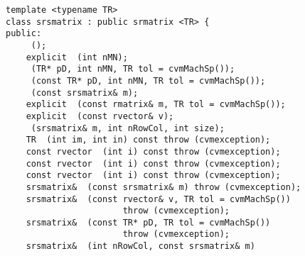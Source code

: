 \bigskip
\noindent
\verb"template <typename TR>"\\
\verb"class srsmatrix : public srmatrix <TR> {"\\
\verb"public:"\\
\verb"    "\verb" ();"\\
\verb"    explicit "\verb" (int nMN);"\\
\verb"    "\verb" (TR* pD, int nMN, TR tol = cvmMachSp());"\\
\verb"    "\verb" (const TR* pD, int nMN, TR tol = cvmMachSp());"\\
\verb"    "\verb" (const srsmatrix& m);"\\
\verb"    explicit "\verb" (const rmatrix& m, TR tol = cvmMachSp());"\\
\verb"    explicit "\verb" (const rvector& v);"\\
\verb"    "\verb" (srsmatrix& m, int nRowCol, int size);"\\
\verb"    TR "\verb" (int im, int in) const throw (cvmexception);"\\
\verb"    const rvector "\verb" (int i) const throw (cvmexception);"\\
\verb"    const rvector "\verb" (int i) const throw (cvmexception);"\\
\verb"    const rvector "\verb" (int i) const throw (cvmexception);"\\
\verb"    srsmatrix& "\verb" (const srsmatrix& m) throw (cvmexception);"\\
\verb"    srsmatrix& "\verb" (const rvector& v, TR tol = cvmMachSp())"\\
\verb"                       throw (cvmexception);"\\
\verb"    srsmatrix& "\verb" (const TR* pD, TR tol = cvmMachSp())"\\
\verb"                       throw (cvmexception);"\\
\verb"    srsmatrix& "\verb" (int nRowCol, const srsmatrix& m)"\\
